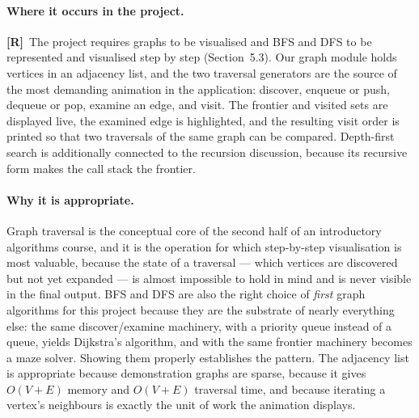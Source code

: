 \documentclass[11pt,a4paper]{article}
\newcommand{\R}{\textcolor{reqc}{\textbf{[R]}}}     %
\begin{document}
\paragraph{Where it occurs in the project.} \R\ The project requires graphs to be visualised
and BFS and DFS to be represented and visualised step by step (Section~5.3). Our graph module
holds vertices in an adjacency list, and the two traversal generators are the source of the
most demanding animation in the application: discover, enqueue or push, dequeue or pop,
examine an edge, and visit. The frontier and visited sets are displayed live, the examined
edge is highlighted, and the resulting visit order is printed so that two traversals of the
same graph can be compared. Depth-first search is additionally connected to the recursion
discussion, because its recursive form makes the call stack the frontier.

\paragraph{Why it is appropriate.} Graph traversal is the conceptual core of the second half
of an introductory algorithms course, and it is the operation for which step-by-step
visualisation is most valuable, because the state of a traversal --- which vertices are
discovered but not yet expanded --- is almost impossible to hold in mind and is never visible
in the final output. BFS and DFS are also the right choice of \emph{first} graph algorithms
for this project because they are the substrate of nearly everything else: the same
discover/examine machinery, with a priority queue instead of a queue, yields Dijkstra's
algorithm, and with the same frontier machinery becomes a maze solver. Showing them properly
establishes the pattern. The adjacency list is appropriate because demonstration graphs are
sparse, because it gives $O(V+E)$ memory and $O(V+E)$ traversal time, and because iterating
a vertex's neighbours is exactly the unit of work the animation displays.
\end{document}
